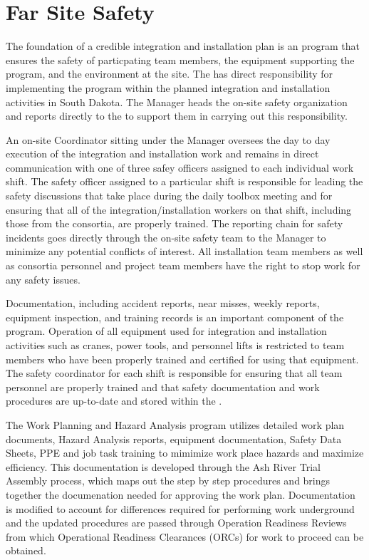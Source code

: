 \section{Far Site Safety}
\label{sec:far_site_safety}

The foundation of a credible integration and installation plan is 
an  program that ensures the safety of particpating team 
members, the equipment supporting the program, and the environment 
at the  site.  The  has direct responsibility 
for implementing the   program within 
the planned integration and installation activities in South Dakota.  
The   Manager heads the on-site safety 
organization and reports directly to the  to support them
in carrying out this responsibility.

An on-site  Coordinator sitting under the  
 Manager oversees the day to day execution of the integration 
and installation work and remains in direct communication with one of 
three safey officers assigned to each individual work shift.  The safety 
officer assigned to a particular shift is responsible for leading the 
safety discussions that take place during the daily toolbox meeting and 
for ensuring that all of the integration/installation workers on that 
shift, including those from the consortia, are properly trained.  The 
reporting chain for safety incidents goes directly through the on-site 
safety team to the   Manager to minimize 
any potential conflicts of interest.  All  installation team 
members as well as  consortia personnel and  project 
team members have the right to stop work for any safety issues.

Documentation, including accident reports, near misses, weekly reports, 
equipment inspection, and training records is an important component of 
the   program.  Operation of all equipment 
used for integration and installation activities such as cranes, power 
tools, and personnel lifts is restricted to team members who have been
properly trained and certified for using that equipment.  The safety 
coordinator for each shift is responsible for ensuring that all team 
personnel are properly trained and that safety documentation and work 
procedures are up-to-date and stored within the .  

The Work Planning and Hazard Analysis program utilizes detailed work
plan documents, Hazard Analysis reports, equipment documentation,
Safety Data Sheets, PPE and job task training to mimimize work place
hazards and maximize efficiency.  This documentation is developed
through the Ash River Trial Assembly process, which maps out the 
step by step procedures and brings together the documenation needed 
for approving the work plan.  Documentation is modified to account for  
differences required for performing work underground and the updated 
procedures are passed through Operation Readiness Reviews from which   
Operational Readiness Clearances (ORCs) for work to proceed can be 
obtained.

